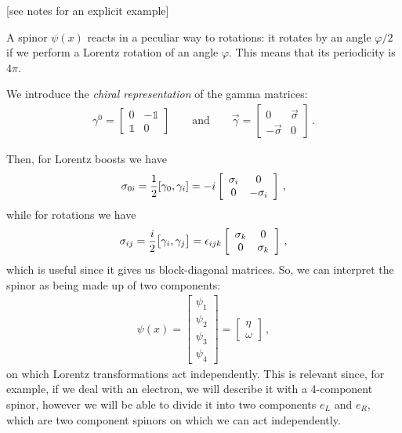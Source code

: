 \documentclass[main.tex]{subfiles}
\begin{document}
[see notes for an explicit example]

A spinor \(\psi (x)\) reacts in a peculiar way to rotations: it rotates by an angle \( \varphi /2 \) if we perform a Lorentz rotation of an angle \(\varphi \). 
This means that its periodicity is \(4\pi \).  

We introduce the \emph{chiral representation} of the gamma matrices: 
%
\begin{align}
\gamma^{0} = \left[\begin{array}{cc}
0 & -\mathbb{1} \\ 
\mathbb{1} & 0
\end{array}\right]
\qquad \text{and} \qquad
\vec{\gamma} = \left[\begin{array}{cc}
0 & \vec{\sigma}  \\ 
-\vec{\sigma} & 0
\end{array}\right]
\,.
\end{align}

Then, for Lorentz boosts we have 
%
\begin{align}
\sigma_{0i} = \frac{1}{2} \qty[\gamma_0, \gamma_{i}] = -i \left[\begin{array}{cc}
\sigma_{i} & 0 \\ 
0 & - \sigma_{i}
\end{array}\right]
\,,
\end{align}
%
while for rotations we have 
%
\begin{align}
\sigma_{ij} = \frac{i}{2} \qty[\gamma_{i}, \gamma_{j}] = \epsilon_{ijk} \left[\begin{array}{cc}
\sigma_{k} & 0 \\ 
0 & \sigma_{k}
\end{array}\right]
\,,
\end{align}
%
which is useful since it gives us block-diagonal matrices. 
So, we can interpret the spinor as being made up of two components: 
%
\begin{align}
\psi (x) = \left[\begin{array}{c}
\psi_1  \\ 
\psi_2  \\ 
\psi_3   \\ 
\psi_4 
\end{array}\right] 
= \left[\begin{array}{c}
\eta  \\ 
\omega 
\end{array}\right]
\,,
\end{align}
%
on which Lorentz transformations act independently. 
This is relevant since, for example, if we deal with an electron, we  will describe it with a 4-component spinor, however we will be able to divide it into two components \(e_L\) and \(e_R\), which are two component spinors on which we can act independently. 
\end{document}
